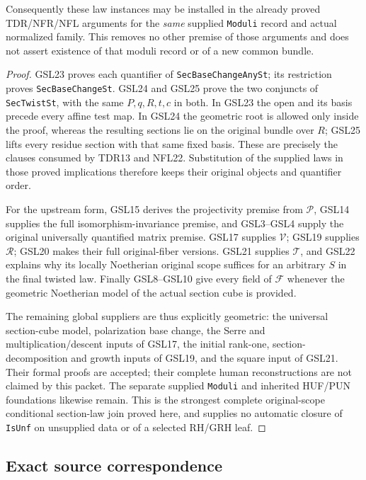 Consequently these law instances may be installed in the already
proved TDR/NFR/NFL arguments for the \emph{same} supplied
\texttt{Moduli} record and actual normalized family.
This removes no other premise of those arguments and does not
assert existence of that moduli record or of a new common bundle.

\begin{proof}
GSL23 proves each quantifier of \texttt{SecBaseChangeAnySt};
its restriction proves \texttt{SecBaseChangeSt}.  GSL24 and
GSL25 prove the two conjuncts of \texttt{SecTwistSt}, with
the same $P,q,R,t,c$ in both.  In GSL23 the open and its
basis precede every affine test map.  In GSL24 the geometric
root is allowed only inside the proof, whereas the resulting
sections lie on the original bundle over $R$; GSL25 lifts
every residue section with that same fixed basis.  These
are precisely the clauses consumed by TDR13 and NFL22.
Substitution of the supplied laws in those proved implications
therefore keeps their original objects and quantifier order.

For the upstream form, GSL15 derives the projectivity premise
from $\mathcal P$, GSL14 supplies the full isomorphism-invariance
premise, and GSL3--GSL4 supply the original universally quantified
matrix premise.  GSL17 supplies $\mathcal V$; GSL19 supplies
$\mathcal R$; GSL20 makes their full original-fiber versions.
GSL21 supplies $\mathcal T$, and GSL22 explains why its
locally Noetherian original scope suffices for an arbitrary
$S$ in the final twisted law.  Finally GSL8--GSL10 give
every field of $\mathcal F$ whenever the geometric
Noetherian model of the actual section cube is provided.

The remaining global suppliers are thus explicitly geometric:
the universal section-cube model, polarization base change,
the Serre and multiplication/descent inputs of GSL17,
the initial rank-one, section-decomposition and growth inputs
of GSL19, and the square input of GSL21.  Their formal proofs
are accepted; their complete human reconstructions are not
claimed by this packet.  The separate supplied \texttt{Moduli}
and inherited HUF/PUN foundations likewise remain.  This is
the strongest complete original-scope conditional section-law
join proved here, and supplies no automatic closure of
\texttt{IsUnf} on unsupplied data or of a selected RH/GRH leaf.
\end{proof}

\subsection*{Exact source correspondence}

